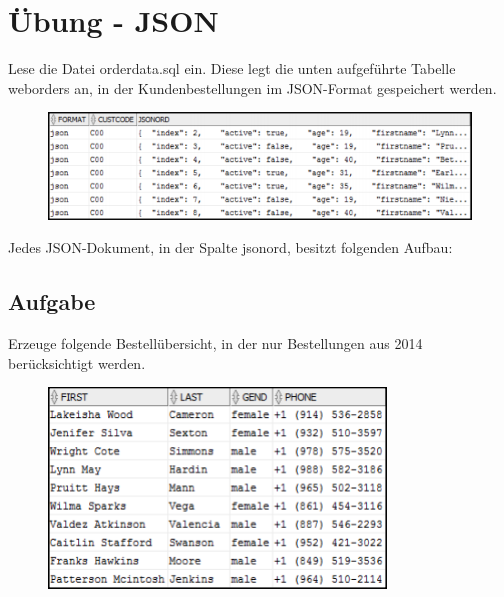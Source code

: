 \section{Übung - JSON}
\label{sec:uebung_10}
Lese die Datei orderdata.sql ein. Diese legt die unten aufgeführte Tabelle weborders an, in der Kundenbestellungen im JSON-Format gespeichert werden.

\begin{figure}[H]
  \centering
  \includegraphics[width=1\textwidth]{img//uebung_10_-_vorbereitung.png}
  \label{img:uebung_10_-_vorbereitung}
\end{figure}

Jedes JSON-Dokument, in der Spalte jsonord, besitzt folgenden Aufbau:

\label{subsec:uebung_10.aufgabe_01}
\subsection{Aufgabe}
Erzeuge folgende Bestellübersicht, in der nur Bestellungen aus 2014 berücksichtigt werden.

\begin{figure}[H]
  \centering
  \includegraphics[width=0.8\textwidth]{img//uebung_10_-_aufgabe_01.png}
  \label{img:uebung_10_-_aufgabe_01}
\end{figure}

